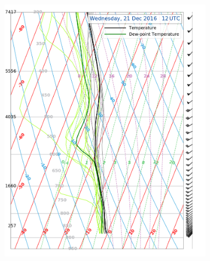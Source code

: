 \begin{figure}
	\centering
	\begin{subfigure}[b]{0.49\textwidth}
		\includegraphics[width=\textwidth]{./fig_Sounding/20161220_36}
		\caption{}\label{fig:meps_sound_20}
	\end{subfigure}
	\begin{subfigure}[b]{0.49\textwidth}

\end{subfigure}
\end{figure}

